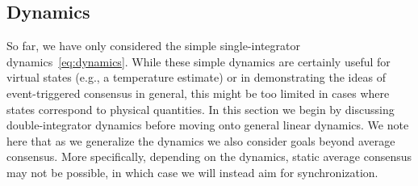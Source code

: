 \documentclass{autart}
\newcommand{\realnonnegative}{\mathbb{R}_{\ge 0}}
\newcommand{\until}[1]{\{1,\dots, #1\}}
\newcommand{\TwoNorm}[1]{\|#1\|}
\begin{document}



\subsection{\textbf{Dynamics}}\label{se:dynamics}

So far, we have only considered the simple single-integrator
dynamics~\eqref{eq:dynamics}. While these simple dynamics are
certainly useful for virtual states (e.g., a temperature estimate) or
in demonstrating the ideas of event-triggered consensus in general,
this might be too limited in cases where states correspond to physical
quantities. %
In this section we begin by discussing double-integrator dynamics
before moving onto general linear dynamics. We note here that as we
generalize the dynamics we also consider goals beyond average
consensus. More specifically, depending on the dynamics, static
average consensus may not be possible, in which case we will instead aim for
synchronization.
\end{document}
